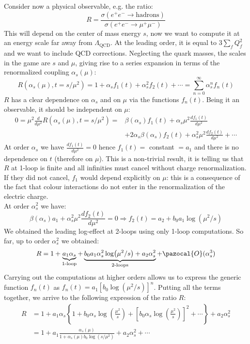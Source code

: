 \documentclass[../main.tex]{subfiles}
\begin{document}
Consider now a physical observable, e.g. the ratio: 
\[
R=\frac{\sigma(e^+e^-\to\text{hadrons})}{\sigma(e^+e^-\to\mu^+\mu^-)}
\]
This will depend on the center of mass energy $s$, now we want to compute it at an energy scale far away from $\Lambda_{\text{QCD}}$. At the leading order, it is equal to $3\sum_fQ_f^2$ and we want to include QCD corrections. Neglecting the quark masses, the scales in the game are $s$ and $\mu$, giving rise to a series expansion in terms of the renormalized coupling $\alpha_s(\mu)$:
\[
R(\alpha_s(\mu),t=s/\mu^2)=1+\alpha_sf_1(t)+\alpha_s^2f_2(t)+\cdots=\sum_{n=0}^\infty\alpha_s^nf_n(t)
\]
$R$ has a clear dependence on $\alpha_s$ and on $\mu$ via the functions $f_n(t)$. Being it an observable, it should be independent on $\mu$:
\begin{align*}
0=\mu^2\frac{d}{d\mu^2}R(\alpha_s(\mu),t=s/\mu^2)=&\beta(\alpha_s)f_1(t)+\alpha_s\mu^2\frac{df_1(t)}{d\mu^2}\\
&+2\alpha_s\beta(\alpha_s)f_2(t)+\alpha_s^2\mu^2\frac{df_2(t)}{d\mu^2}+\cdots
\end{align*}
At order $\alpha_s$ we have $\frac{df_1(t)}{d\mu^2}=0$ hence $f_1(t)=$ constant $=a_1$ and there is no dependence on $t$ (therefore on $\mu$). This is a non-trivial result, it is telling us that $R$ at 1-loop is finite and all infinities must cancel without charge renormalization. If they did not cancel, $f_1$ would depend explicitly on $\mu$: this is a consequence of the fact that colour interactions do not enter in the renormalization of the electric charge.\\
At order $\alpha_s^2$ we have:
\[
\beta(\alpha_s)a_1+\alpha_s^2\mu^2\frac{df_2(t)}{d\mu^2}=0\Rightarrow f_2(t)=a_2+b_0a_1\log(\mu^2/s)
\]
We obtained the leading log-effect at 2-loops using only 1-loop computations. So far, up to order $\alpha_s^2$ we obtained:
\[
R=1+\underbrace{a_1\alpha_s}_{\text{1-loop}}+\underbrace{b_0a_1\alpha_s^2\log(\mu^2/s)+a_2\alpha_s^2}_{\text{2-loops}}+\pazocal{O}(\alpha_s^3)
\]
Carrying out the computations at higher orders allows us to express the generic function $f_n(t)$ as $f_n(t)=a_1[b_0\log(\mu^2/s)]^n$. Putting all the terms together, we arrive to the following expression of the ratio $R$:
\begin{align*}
R&=1+a_1\alpha_s\left\{1+b_0\alpha_s\log\left(\frac{\mu^2}{s}\right)+\left[b_0\alpha_s\log\left(\frac{\mu^2}{s}\right)\right]^2+\cdots\right\}+a_2\alpha_s^2\\
&=1+a_1\frac{\alpha_s(\mu)}{1+\alpha_s(\mu)b_0\log(s/\mu^2)}+a_2\alpha_s^2+\cdots
\end{align*}
\end{document}
